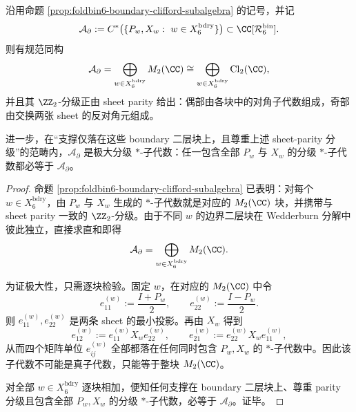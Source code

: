 \begin{theorem}\label{thm:foldbin6-boundary-clifford-maximal-graded-subalgebra}
沿用命题 \ref{prop:foldbin6-boundary-clifford-subalgebra} 的记号，并记
\[
\mathcal A_{\partial}
:=
C^\ast\bigl(\{P_w,X_w:\ w\in X_6^{\mathrm{bdry}}\}\bigr)
\subset
\CC[\mathcal R_6^{\mathrm{bin}}].
\]
则有规范同构
\[
\mathcal A_{\partial}
=
\bigoplus_{w\in X_6^{\mathrm{bdry}}} M_2(\CC)
\cong
\bigoplus_{w\in X_6^{\mathrm{bdry}}}\mathrm{Cl}_2(\CC),
\]
并且其 \(\ZZ_2\)-分级正由 sheet parity 给出：偶部由各块中的对角子代数组成，奇部由交换两张 sheet 的反对角元组成。

进一步，在“支撑仅落在这些 boundary 二层块上，且尊重上述 sheet-parity 分级”的范畴内，\(\mathcal A_{\partial}\) 是极大分级 \(\ast\)-子代数：任一包含全部 \(P_w\) 与 \(X_w\) 的分级 \(\ast\)-子代数都必等于 \(\mathcal A_{\partial}\)。
\end{theorem}
\begin{proof}
命题 \ref{prop:foldbin6-boundary-clifford-subalgebra} 已表明：对每个 \(w\in X_6^{\mathrm{bdry}}\)，由 \(P_w\) 与 \(X_w\) 生成的 \(\ast\)-子代数就是对应的 \(M_2(\CC)\) 块，并携带与 sheet parity 一致的 \(\ZZ_2\)-分级。由于不同 \(w\) 的边界二层块在 Wedderburn 分解中彼此独立，直接求直和即得
\[
\mathcal A_{\partial}
=
\bigoplus_{w\in X_6^{\mathrm{bdry}}}M_2(\CC).
\]

为证极大性，只需逐块检验。固定 \(w\)，在对应的 \(M_2(\CC)\) 中令
\[
e_{11}^{(w)}:=\frac{I+P_w}{2},
\qquad
e_{22}^{(w)}:=\frac{I-P_w}{2}.
\]
则 \(e_{11}^{(w)},e_{22}^{(w)}\) 是两条 sheet 的最小投影。再由 \(X_w\) 得到
\[
e_{12}^{(w)}:=e_{11}^{(w)}X_w e_{22}^{(w)},
\qquad
e_{21}^{(w)}:=e_{22}^{(w)}X_w e_{11}^{(w)},
\]
从而四个矩阵单位 \(e_{ij}^{(w)}\) 全部都落在任何同时包含 \(P_w,X_w\) 的 \(\ast\)-子代数中。因此该子代数不可能是真子代数，只能等于整块 \(M_2(\CC)\)。

对全部 \(w\in X_6^{\mathrm{bdry}}\) 逐块相加，便知任何支撑在 boundary 二层块上、尊重 parity 分级且包含全部 \(P_w,X_w\) 的分级 \(\ast\)-子代数，必等于 \(\mathcal A_{\partial}\)。证毕。
\end{proof}

\endinput

